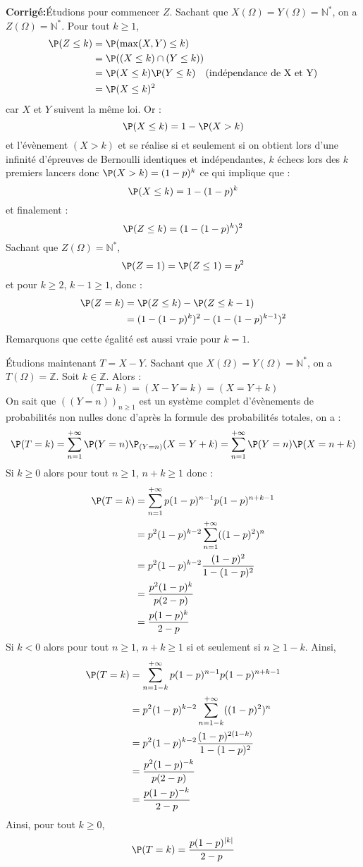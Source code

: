 \documentclass[a4paper,twoside,french,11pt]{VcCours}
\newcommand{\corr}{\textbf{Corrigé:}}
\begin{document}
\corr Étudions pour commencer $Z$. Sachant que $X(\Omega)= Y(\Omega)= \mathbb{N}^*$, on a $Z(\Omega)= \mathbb{N}^*$. Pour tout $k \geq 1$,
\begin{align*}
\P(Z \leq k) & = \P( \max(X,Y) \leq k ) \\
& = \P((X \leq k) \cap (Y \leq k)) \\
& = \P(X \leq k) \P(Y \leq k) \quad \hbox{(indépendance de X et Y)}  \\
& = \P(X \leq k)^2
\end{align*}
car $X$ et $Y$ suivent la même loi. Or :
$$ \P(X \leq k) = 1 - \P(X>k)$$
et l'évènement $(X>k)$ et se réalise si et seulement si on obtient lors d'une infinité d'épreuves de Bernoulli identiques et indépendantes, $k$ échecs lors des $k$ premiers lancers donc $\P(X>k) = (1-p)^k$ ce qui implique que :
$$ \P(X \leq k) = 1 - (1-p)^k$$
et finalement :
$$ \P(Z \leq k) = (1-(1-p)^k)^2$$
Sachant que $Z(\Omega) = \mathbb{N}^*$,
$$\P(Z=1) = \P(Z \leq 1) = p^2$$
et pour $k \geq 2$, $k-1 \geq 1$, donc :
\begin{align*}
\P(Z = k ) &= \P(Z \leq k) - \P(Z \leq k-1) \\
& =  (1-(1-p)^k)^2 -  (1-(1-p)^{k-1})^2 
\end{align*}
Remarquons que cette égalité est aussi vraie pour $k=1$.


Étudions maintenant $T=X-Y$. Sachant que $X(\Omega)= Y(\Omega) = \mathbb{N}^*$, on a $T(\Omega)= \mathbb{Z}$. Soit $k \in \mathbb{Z}$. Alors :
$$ (T=k)= (X-Y=k) = (X=Y+k)$$
On sait que $((Y=n))_{n \geq 1}$ est un système complet d'évènements de probabilités non nulles donc d'après la formule des probabilités totales, on a :
$$\P(T=k)  = \sum_{n=1}^{+ \infty} \P(Y=n) \P_{(Y=n)}(X=Y+k) = \sum_{n=1}^{+ \infty} \P(Y=n) \P(X=n+k) $$
Si $k \geq 0$ alors pour tout $n \geq 1$, $n+ k \geq 1$ donc :
\begin{align*}
\P(T=k) & = \sum_{n=1}^{+ \infty} p(1-p)^{n-1} p (1-p)^{n+k-1} \\
& = p^2 (1-p)^{k-2} \sum_{n=1}^{+ \infty} ((1-p)^2)^n \\
& = p^2 (1-p)^{k-2} \dfrac{(1-p)^2}{1-(1-p)^2} \\
& = \dfrac{p^2(1-p)^{k}}{p(2-p)} \\
& = \dfrac{p(1-p)^{k}}{2-p}
\end{align*}
Si $k<0$ alors pour tout $n \geq 1$, $n+k \geq 1$ si et seulement si $n \geq 1-k$. Ainsi,
\begin{align*}
\P(T=k) & = \sum_{n=1-k}^{+ \infty} p(1-p)^{n-1} p (1-p)^{n+k-1} \\
& = p^2 (1-p)^{k-2} \sum_{n=1-k}^{+ \infty} ((1-p)^2)^n \\
& = p^2 (1-p)^{k-2} \dfrac{(1-p)^{2(1-k)}}{1-(1-p)^2} \\
& = \dfrac{p^2(1-p)^{-k}}{p(2-p)} \\
& = \dfrac{p(1-p)^{-k}}{2-p}
\end{align*}
Ainsi, pour tout $k \geq 0$,
$$ \P(T=k) = \dfrac{p(1-p)^{\vert k \vert}}{2-p}$$
\end{document}
